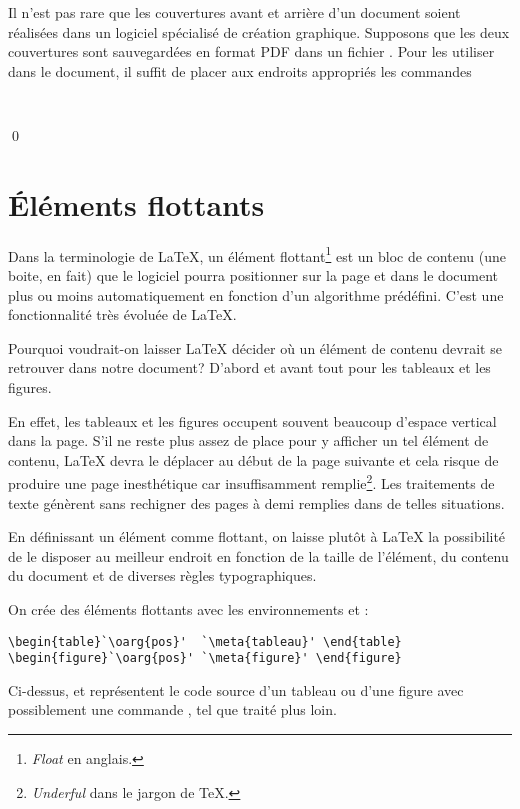 \begin{exemple}
  Il n'est pas rare que les couvertures avant et arrière d'un document
  soient réalisées dans un logiciel spécialisé de création graphique.
  Supposons que les deux couvertures sont sauvegardées en format PDF
  dans un fichier . Pour les utiliser dans le
  document, il suffit de placer aux endroits appropriés les commandes
\begin{lstlisting}


\end{lstlisting}
  \qed
\end{exemple}



\section{Éléments flottants}
\label{sec:tableaux:floats}

Dans la terminologie de {\LaTeX}, un élément flottant\footnote{%
  \emph{Float} en anglais.} %
est un bloc de contenu (une boite, en fait) que le logiciel pourra
positionner sur la page et dans le document plus ou moins
automatiquement en fonction d'un algorithme prédéfini. C'est une
fonctionnalité très évoluée de {\LaTeX}.

Pourquoi voudrait-on laisser {\LaTeX} décider où un élément de contenu
devrait se retrouver dans notre document? D'abord et avant tout pour
les tableaux et les figures.

En effet, les tableaux et les figures occupent souvent beaucoup
d'espace vertical dans la page. S'il ne reste plus assez de place pour
y afficher un tel élément de contenu, {\LaTeX} devra le déplacer au
début de la page suivante et cela risque de produire une page
inesthétique car insuffisamment remplie\footnote{%
  \emph{Underful } dans le jargon de {\TeX}.}. %
Les traitements de texte génèrent sans rechigner des pages à demi
remplies dans de telles situations.

En définissant un élément comme flottant, on laisse plutôt à
{\LaTeX} la possibilité de le disposer au meilleur endroit en fonction
de la taille de l'élément, du contenu du document et de diverses
règles typographiques.

On crée des éléments flottants avec les environnements 
et :
\begin{lstlisting}
\begin{table}`\oarg{pos}'  `\meta{tableau}' \end{table}
\begin{figure}`\oarg{pos}' `\meta{figure}' \end{figure}
\end{lstlisting}
Ci-dessus,  et  représentent le code source
d'un tableau ou d'une figure avec possiblement une commande
, tel que traité plus loin.

